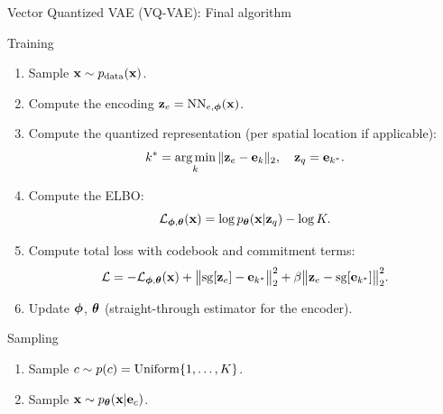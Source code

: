 \documentclass{beamer}
\begin{document}
\begin{frame}{Vector Quantized VAE (VQ-VAE): Final algorithm}
	\begin{block}{Training}
		\begin{enumerate}
			\item Sample $\mathbf{x} \sim p_{\text{data}}(\mathbf{x})$.
			\item Compute the encoding $\mathbf{z}_e = \mathrm{NN}_{e,\boldsymbol{\phi}}(\mathbf{x})$.
			\item Compute the quantized representation (per spatial location if applicable):
			\vspace{-0.3cm}
			\[
				k^* = \operatorname*{arg\,min}_k \|\mathbf{z}_e - \mathbf{e}_k\|_2, \quad \mathbf{z}_q = \mathbf{e}_{k^*}.
			\]
			\vspace{-0.5cm}
			\item Compute the ELBO:
			\vspace{-0.3cm}
			\[
				\mathcal{L}_{\boldsymbol{\phi}, \boldsymbol{\theta}}(\mathbf{x}) = \log p_{\boldsymbol{\theta}}(\mathbf{x} | \mathbf{z}_q) - \log K.
			\]
			\vspace{-0.5cm}
			\item Compute total loss with codebook and commitment terms:
			\vspace{-0.3cm}
			\[
				\mathcal{L} = - \mathcal{L}_{\boldsymbol{\phi}, \boldsymbol{\theta}}(\mathbf{x}) + \big\|\mathrm{sg}[\mathbf{z}_e] - \mathbf{e}_{k^*}\big\|_2^2 + \beta \big\|\mathbf{z}_e - \mathrm{sg}[\mathbf{e}_{k^*}]\big\|_2^2.
			\]
			\vspace{-0.5cm}
			\item Update $\boldsymbol{\phi}$, $\boldsymbol{\theta}$ (straight-through estimator for the encoder).
		\end{enumerate}
	\end{block}
	\eqpause
	\vspace{-0.3cm}
	\begin{block}{Sampling}
		\begin{enumerate}
			\item Sample $c \sim p(c) = \operatorname{Uniform}\{1, \dots, K\}$.
			\item Sample $\mathbf{x} \sim p_{\boldsymbol{\theta}}(\mathbf{x} | \mathbf{e}_c)$.
		\end{enumerate}
	\end{block}
\end{frame}
\end{document}
